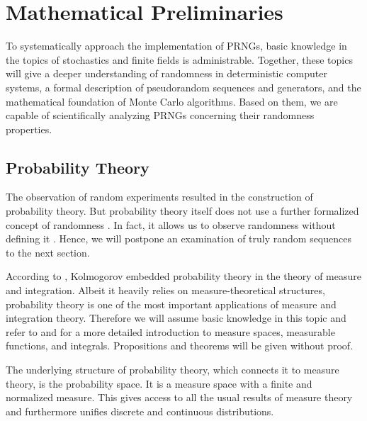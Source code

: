 \documentclass{stdlocal}
\begin{document}
\section{Mathematical Preliminaries} %
\label{sub:mathematical_preliminaries}
  To systematically approach the implementation of PRNGs, basic knowledge in the topics of stochastics and finite fields is administrable.
  Together, these topics will give a deeper understanding of randomness in deterministic computer systems, a formal description of pseudorandom sequences and generators, and the mathematical foundation of Monte Carlo algorithms.
  Based on them, we are capable of scientifically analyzing PRNGs concerning their randomness properties.

  \subsection{Probability Theory} %
  \label{ssub:stochastics}
    The observation of random experiments resulted in the construction of probability theory.
    But probability theory itself does not use a further formalized concept of randomness \autocite{schmidt2009}.
    In fact, it allows us to observe randomness without defining it \autocite{volchan2002}.
    Hence, we will postpone an examination of truly random sequences to the next section.

    According to \textcite{schmidt2009}, Kolmogorov embedded probability theory in the theory of measure and integration.
    Albeit it heavily relies on measure-theoretical structures, probability theory is one of the most important applications of measure and integration theory.
    Therefore we will assume basic knowledge in this topic and refer to \textcite{schmidt2009} and \textcite{elstrodt2011} for a more detailed introduction to measure spaces, measurable functions, and integrals.
    Propositions and theorems will be given without proof.

    The underlying structure of probability theory, which connects it to measure theory, is the probability space.
    It is a measure space with a finite and normalized measure.
    This gives access to all the usual results of measure theory and furthermore unifies discrete and continuous distributions.
    \autocite[p.~193~ff.]{schmidt2009}
\end{document}
